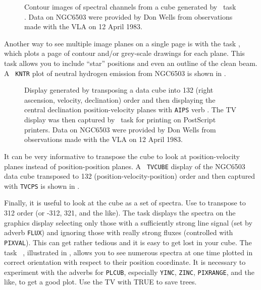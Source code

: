 \begin{figure}
\centering
\caption[{\tt KNTR} contours of spectral channels]{Contour images of
spectral channels from a cube generated by \AIPS\ task {\tt
{}}\@.  Data on NGC6503 were provided by Don Wells from
observations made with the VLA on 12 April 1983.}
\label{fig:lineKNTR}
\end{figure}

     Another way to see multiple image planes on a single page is with
the task {\tt {}}, which plots a page of contour and/or
grey-scale drawings for each plane.  This task allows you to include
``star'' positions and even an outline of the clean beam.  A {\tt
KNTR} plot of neutral hydrogen emission from NGC6503 is shown in
.

\begin{figure}
\centering
\caption[{\tt TVCUBE} display of transposed cube.]{Display generated
by transposing a data cube into 132 (right ascension, velocity,
declination) order and then displaying the central declination
position-velocity planes with {\tt AIPS} verb {\tt {}}\@.
The TV display was then captured by \AIPS\ task {\tt {}} for
printing on PostScript printers.  Data on NGC6503 were provided by Don
Wells from observations made with the VLA on 12 April
1983.}
\label{fig:linetrans}
\end{figure}

     It can be very informative to transpose the cube to look at
position-velocity planes instead of position-position planes.  A {\tt
TVCUBE} display of the NGC6503 data cube transposed to 132
(position-velocity-position) order and then captured with {\tt TVCPS}
is shown in .

     Finally, it is useful to look at the cube as a set of spectra.
Use {\tt {}} to transpose to 312 order (or -312, 321, and
the like).  The task {\tt {}} displays the spectra on the
graphics display selecting only those with a sufficiently strong line
signal (set by adverb {\tt FLUX}) and ignoring those with really
strong fluxes (controlled with {\tt PIXVAL})\@.  This can get rather
tedious and it is easy to get lost in your cube.  The task {\tt
{}}, illustrated in , allows you to see
numerous spectra at one time plotted in correct orientation with
respect to their position coordinate.  It is necessary to experiment
with the adverbs for {\tt PLCUB}, especially {\tt YINC}, {\tt ZINC},
{\tt PIXRANGE}, and the like, to get a good plot.  Use the TV with
{\us {}\qs TRUE \CR} to save trees.

